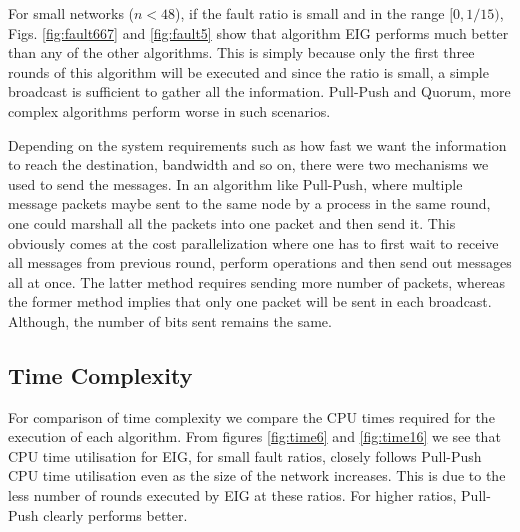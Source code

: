 For small networks ($n < 48$), if the fault ratio is small and in the range $[0, 1/15)$, Figs. \ref{fig:fault667} and \ref{fig:fault5} show that algorithm EIG performs much better than any of the other algorithms. This is simply because only the first three rounds of this algorithm will be executed and since the ratio is small, a simple broadcast is sufficient to gather all the information. Pull-Push and Quorum, more complex algorithms perform worse in such scenarios.

Depending on the system requirements such as how fast we want the information to reach the destination, bandwidth and so on, there were two mechanisms we used to send the messages. In an algorithm like Pull-Push, where multiple message packets maybe sent to the same node by a process in the same round, one could marshall all the packets into one packet and then send it. This obviously comes at the cost parallelization where one has to first wait to receive all messages from previous round, perform operations and then send out messages all at once. The latter method requires sending more number of packets, whereas the former method implies that only one packet will be sent in each broadcast. Although, the number of bits sent remains the same. %


\subsection{Time Complexity}

For comparison of time complexity we compare the CPU times required for the execution of each algorithm.  From figures \ref{fig:time6} and \ref{fig:time16} we see that CPU time utilisation for EIG, for small fault ratios, closely follows Pull-Push CPU time utilisation even as the size of the network increases. This is due to the less number of rounds executed by EIG at these ratios. For higher ratios, Pull-Push clearly performs better.

